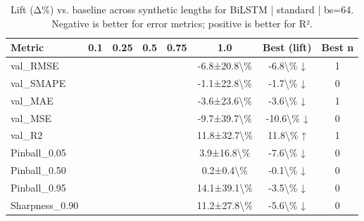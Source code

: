 \begin{table}
\caption{Lift (Δ\%) vs. baseline across synthetic lengths for BiLSTM | standard | bs=64. Negative is better for error metrics; positive is better for R².}
\label{tab:lift_BiLSTM_standard_bs64}
\begin{tabular}{lccccccc}
\toprule
Metric & 0.1 & 0.25 & 0.5 & 0.75 & 1.0 & Best (lift) & Best n \\
\midrule
val\_RMSE &  &  &  &  & -6.8±20.8\textbackslash \% & -6.8\textbackslash \% ↓ & 1 \\
val\_SMAPE &  &  &  &  & -1.1±22.8\textbackslash \% & -1.7\textbackslash \% ↓ & 0 \\
val\_MAE &  &  &  &  & -3.6±23.6\textbackslash \% & -3.6\textbackslash \% ↓ & 1 \\
val\_MSE &  &  &  &  & -9.7±39.7\textbackslash \% & -10.6\textbackslash \% ↓ & 0 \\
val\_R2 &  &  &  &  & 11.8±32.7\textbackslash \% & 11.8\textbackslash \% ↑ & 1 \\
Pinball\_0.05 &  &  &  &  & 3.9±16.8\textbackslash \% & -7.6\textbackslash \% ↓ & 0 \\
Pinball\_0.50 &  &  &  &  & 0.2±0.4\textbackslash \% & -0.1\textbackslash \% ↓ & 0 \\
Pinball\_0.95 &  &  &  &  & 14.1±39.1\textbackslash \% & -3.5\textbackslash \% ↓ & 0 \\
Sharpness\_0.90 &  &  &  &  & 11.2±27.8\textbackslash \% & -5.6\textbackslash \% ↓ & 0 \\
\bottomrule
\end{tabular}
\end{table}
